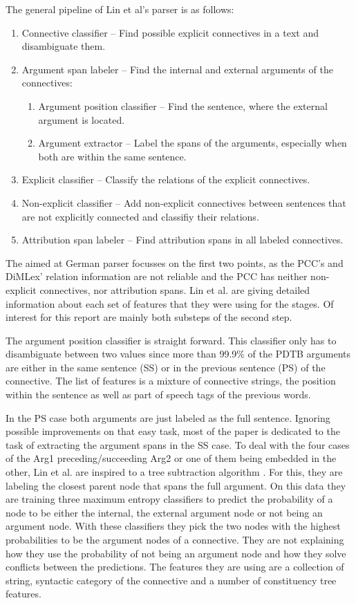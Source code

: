 \documentclass[10pt,a4paper]{article}
\begin{document}
The general pipeline of Lin et al's parser is as follows:
\begin{enumerate}
\item Connective classifier -- Find possible explicit connectives in a text and disambiguate them.
\item Argument span labeler -- Find the internal and external arguments of the connectives:
	\begin{enumerate}
	\item Argument position classifier -- Find the sentence, where the external argument is located.
	\item Argument extractor -- Label the spans of the arguments, especially when both are within the 									same sentence.
	\end{enumerate}
\item Explicit classifier -- Classify the relations of the explicit connectives.
\item Non-explicit classifier -- Add non-explicit connectives between sentences that are not explicitly connected and classifiy their relations.
\item Attribution span labeler -- Find attribution spans in all labeled connectives.
\end{enumerate}

The aimed at German parser focusses on the first two points, as the PCC's and DiMLex' relation information are not reliable and the PCC has neither non-explicit connectives, nor attribution spans. Lin et al. are giving detailed information about each set of features that they were using for the stages. Of interest for this report are mainly both substeps of the second step.

The argument position classifier is straight forward. This classifier only has to disambiguate between two values since more than 99.9\% of the PDTB arguments are either in the same sentence (SS) or in the previous sentence (PS) of the connective. The  list of features is a mixture of connective strings, the position within the sentence as well as part of speech tags of the previous words.

In the PS case both arguments are just labeled as the full sentence. Ignoring possible improvements on that easy task, most of the paper is dedicated to the task of extracting the argument spans in the SS case.  To deal with the four cases of the Arg1 preceding/succeeding Arg2 or one of them being embedded in the other, Lin et al. are inspired to a tree subtraction algorithm \cite[p.~17]{Lin12}. For this, they are labeling the closest parent node that spans the full argument. On this data they are training three maximum entropy classifiers to predict the probability of a node to be either the internal, the external argument node or not being an argument node. With these classifiers they pick the two nodes with the highest probabilities to be the argument nodes of a connective. They are not explaining how they use the probability of not being an argument node and how they solve conflicts between the predictions. The features they are using are a collection of string, syntactic category of the connective and a number of constituency tree features.
\end{document}
